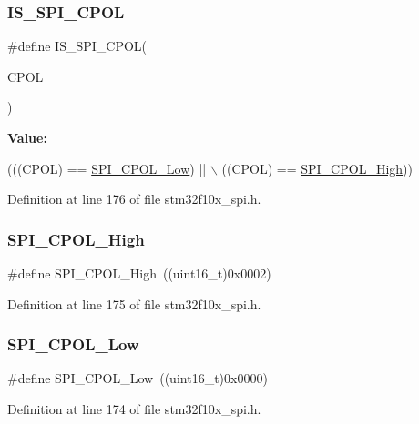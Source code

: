 \subsubsection{\texorpdfstring{I\+S\+\_\+\+S\+P\+I\+\_\+\+C\+P\+OL}{IS\_SPI\_CPOL}}
{\footnotesize\ttfamily \#define I\+S\+\_\+\+S\+P\+I\+\_\+\+C\+P\+OL(\begin{DoxyParamCaption}\item[{}]{C\+P\+OL }\end{DoxyParamCaption})}

{\bfseries Value\+:}
\begin{DoxyCode}
(((CPOL) == \hyperlink{group___s_p_i___clock___polarity_ga3dbc0234c4b4e7c37137e7c189f3c085}{SPI\_CPOL\_Low}) || \(\backslash\)
                           ((CPOL) == \hyperlink{group___s_p_i___clock___polarity_ga4431f2edf42f8298d5bbe693351edbb0}{SPI\_CPOL\_High}))
\end{DoxyCode}


Definition at line 176 of file stm32f10x\+\_\+spi.\+h.

\mbox{\label{group___s_p_i___clock___polarity_ga4431f2edf42f8298d5bbe693351edbb0}} 
\subsubsection{\texorpdfstring{S\+P\+I\+\_\+\+C\+P\+O\+L\+\_\+\+High}{SPI\_CPOL\_High}}
{\footnotesize\ttfamily \#define S\+P\+I\+\_\+\+C\+P\+O\+L\+\_\+\+High~((uint16\+\_\+t)0x0002)}



Definition at line 175 of file stm32f10x\+\_\+spi.\+h.

\mbox{\label{group___s_p_i___clock___polarity_ga3dbc0234c4b4e7c37137e7c189f3c085}} 
\subsubsection{\texorpdfstring{S\+P\+I\+\_\+\+C\+P\+O\+L\+\_\+\+Low}{SPI\_CPOL\_Low}}
{\footnotesize\ttfamily \#define S\+P\+I\+\_\+\+C\+P\+O\+L\+\_\+\+Low~((uint16\+\_\+t)0x0000)}



Definition at line 174 of file stm32f10x\+\_\+spi.\+h.


